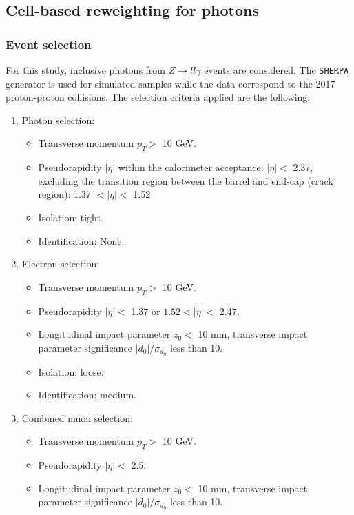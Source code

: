 \subsection{Cell-based reweighting for photons}
\label{gamma:ss:reweighting:photon}

\subsubsection{Event selection}
\label{gamma:ss:reweighting:photon:RadZSel}
For this study, inclusive photons from $Z\rightarrow ll\gamma$ events are considered. The \verb|SHERPA| generator is used for simulated samples while the data correspond to the 2017 proton-proton collisions. The selection criteria applied are the following:
\begin{enumerate}
    \item Photon selection:  
    \begin{itemize}
    \item Transverse momentum $p_T > $  10 GeV.
    \item Pseudorapidity $|\eta|$ within the calorimeter acceptance: $|\eta| < $ 2.37, excluding the transition region between the barrel and end-cap (crack region): 1.37 $ < |\eta| < $ 1.52
    \item Isolation: tight.
    \item Identification: None. 
\end{itemize}
    \item Electron selection:
    \begin{itemize}
        \item Transverse momentum $p_T > $ 10 GeV.
        \item Pseudorapidity $|\eta| < $ 1.37 or $1.52 < |\eta| < $ 2.47.
        \item Longitudinal impact parameter $z_0 < $ 10 mm, transverse impact parameter significance $|d_0|/\sigma_{d_0}$ less than 10.
        \item Isolation: loose.
        \item Identification: medium.
    \end{itemize}
    \item Combined muon selection: 
    \begin{itemize}
        \item Transverse momentum $p_T > $ 10 GeV.
        \item Pseudorapidity $|\eta| < $ 2.5.
        \item Longitudinal impact parameter $z_0 < $ 10 mm, transverse impact parameter significance $|d_0|/\sigma_{d_0}$ less than 10.

\end{itemize}
\end{enumerate}
